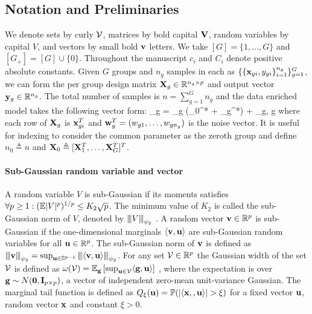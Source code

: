 \subsection{Notation and Preliminaries}
We denote sets by curly $\cV$, matrices by bold capital $\mathbf{V}$, random variables by capital $V$, and vectors by small bold $\mathbf{v}$ letters.
We take $[G] = \{1, \dots, G\}$ and $[G_+] = [G] \cup \{0\}$. Throughout the manuscript $c_i$ and $C_i$ denote positive absolute constants.
Given $G$ groups and $n_g$ samples in each as $\{ \{\mathbf{x}_{gi}, y_{gi} \}_{i=1}^{n_g} \}_{g = 1}^G$, we can form the per group design matrix $\mathbf{X}_g \in \mathbb R^{n_g \times p}$ and output vector $\mathbf{y}_g \in \mathbb R ^{n_g}$.
The total number of samples is  $n = \sum_{g = 1}^{G} n_g$ and the data enriched model takes the following vector form:
\beq \label{eq:dirtymodel}
\y_g = \X_g (\bbeta _0^* + \bbeta _g^*) + \w_g,  \quad \forall g \in [G]
\eeq
where each row of $\mathbf{X}_g$ is $\mathbf{x}_{gi}^T$ and $\mathbf{w}_g^T = (w_{g1}, \dots, w_{gn_g})$ is the noise vector. It is useful for indexing to consider the common parameter as the zeroth group and define $n_0 \triangleq n$ and $\mathbf{X}_0 \triangleq [\mathbf{X}_1^T, \dots, \mathbf{X}_G^T]^T$.

\paragraph{Sub-Gaussian random variable and vector}
A random variable $V$ is sub-Gaussian if its moments satisfies $\forall p \geq 1: (\mathbb{E} |V|^p )^{1/p} \leq K_2 \sqrt{p}$.
The minimum value of $K_2$ is called the sub-Gaussian  norm of $V$, denoted by ${\left\vert\kern-0.25ex\left\vert\kern-0.25ex\left\vert V \right\vert\kern-0.25ex\right\vert\kern-0.25ex\right\vert}_{\psi_2}$ \cite{vers12}.
A random vector $\mathbf{v} \in \mathbb R^p$ is sub-Gaussian if the one-dimensional marginals $\langle \mathbf{v}, \mathbf{u} \rangle$ are sub-Gaussian random variables for all $\mathbf{u} \in \mathbb R^p$. The sub-Gaussian norm of $\mathbf{v}$ is defined \cite{vers12} as ${\left\vert\kern-0.25ex\left\vert\kern-0.25ex\left\vert \mathbf{v} \right\vert\kern-0.25ex\right\vert\kern-0.25ex\right\vert}_{\psi_2} = \sup_{\mathbf{u} \in \mathbb S^{p-1}} {\left\vert\kern-0.25ex\left\vert\kern-0.25ex\left\vert \langle \mathbf{v}, \mathbf{u} \rangle \right\vert\kern-0.25ex\right\vert\kern-0.25ex\right\vert}_{\psi_2}$.
For any set $\cV \in \reals^p$ the Gaussian width of the set $\cV$ is defined as $\omega(\cV) = \ex_\g \left[ \sup_{\u \in \cV} \langle \g, \u \rangle \right]$ \cite{vershynin2018high}, where the expectation is over $\mathbf{g} \sim N(\mathbf{0}, \mathbf{I}_{p \times p})$, a vector of independent zero-mean unit-variance Gaussian. The marginal tail function is defined as $Q_{\xi}(\mathbf{u}) = \mathbb{P}(|\langle \mathbf{x}, , \mathbf{u} \rangle| > \xi)$ for a fixed vector $\mathbf{u}$, random vector $\mathbf{x}$ and constant $\xi > 0$. 



